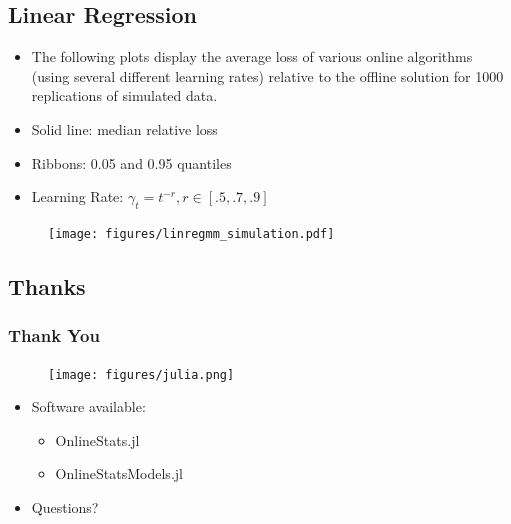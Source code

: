 \documentclass{beamer}
\begin{document}
\subsection{Linear Regression}
\begin{frame}
  \begin{itemize}
    \item The following plots display the average loss of various online algorithms (using several different learning rates) relative to the offline solution for 1000 replications of simulated data.
    \item Solid line: median relative loss
    \item Ribbons: 0.05 and 0.95 quantiles
  \end{itemize}
\end{frame}
\begin{frame}
  \begin{itemize}
    \item Learning Rate: $\gamma_t = t^{-r}, r\in[.5, .7, .9]$
  \end{itemize}
  \begin{figure}
    \texttt{[image: figures/linregmm\_simulation.pdf]}
  \end{figure}
\end{frame}

\subsection{Thanks}
\begin{frame}
  \frametitle{Thank You}
  \begin{figure}
    \texttt{[image: figures/julia.png]}
  \end{figure}
  \begin{itemize}
    \item Software available:
    \begin{itemize}
      \item OnlineStats.jl
      \item OnlineStatsModels.jl
    \end{itemize}
    \item Questions?
  \end{itemize}
\end{frame}




\end{document}
